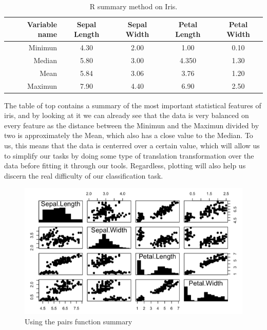 \documentclass[12pt]{report}
\begin{document}
\begin{table}[H]
		\caption{R summary method on Iris.}
	\begin{center}
	\label{tab:table_Iris}
		\begin{tabular}{r|c|c|c|c} %
			\textbf{Variable name} & \textbf{Sepal Length} & \textbf{Sepal Width} & \textbf{Petal Length} & \textbf{Petal Width}\\
			\hline
			Minimun & 4.30 & 2.00 & 1.00 & 0.10\\
			Median & 5.80 & 3.00 & 4.350 & 1.30\\
			Mean & 5.84 & 3.06 & 3.76 & 1.20\\
			Maximun & 7.90 & 4.40 & 6.90 & 2.50\\
		\end{tabular}
	\end{center}
\end{table}

The table of top contains a summary of the most important statistical features of iris, and by looking at it we can already see that the data is very balanced on every feature as the distance between the Minimun and the Maximun divided by two is approximately the Mean, which also has a close value to the Median. To us, this means that the data is centerred over a certain value, which will allow us to simplify our tasks by doing some type of translation transformation over the data before fitting it through our tools. Regardless, plotting will also help us discern the real difficulty of our classification task.

\begin{figure}[H]
	\centering
	\includegraphics[width=13cm]{Figuras_tfg/Figure_Iris_Histogram}
	\caption{Using the pairs function summary}
	\label{fig:figure_pairs_iris}
\end{figure}
\end{document}

